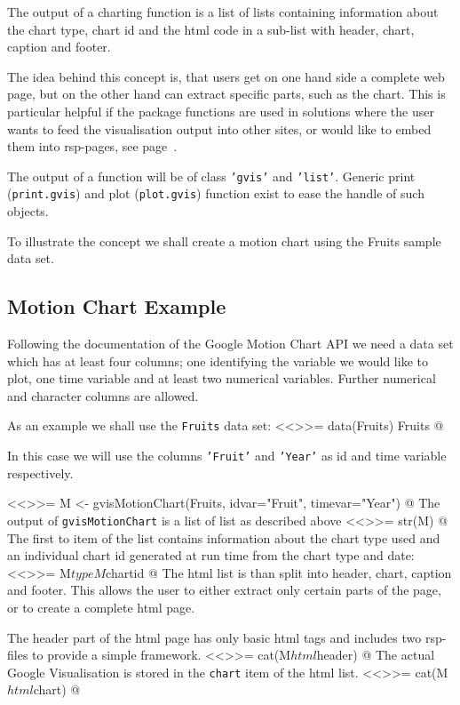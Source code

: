 The output of a \googleVis charting function is a list of lists
containing information about the chart type, chart id and the html
code in a  sub-list with header, chart, caption and footer.

The idea behind this concept is, that users get on one hand side a
complete web page, but on the other hand can extract specific parts,
such as the chart. This is particular helpful if the package functions
are used in solutions where the user wants to feed the visualisation
output into other sites, or would like to embed them into rsp-pages,
see page~\pageref{rspexample}.  

The output of a \googleVis function will be of class \texttt{'gvis'}
and \texttt{'list'}. Generic print (\texttt{print.gvis})  and plot
(\texttt{plot.gvis}) function exist to ease the handle of such objects. 

To illustrate the concept we shall create a motion chart using the Fruits
sample data set.

\subsection{Motion Chart Example}

Following the documentation of the Google Motion Chart API we need a
data set which has at least four columns; one identifying the
variable we would like to plot, one time variable and at least two
numerical variables. Further numerical and character columns are allowed.

As an example we shall use the \texttt{Fruits} data set:
<<>>=
data(Fruits)
Fruits
@

In this case we will use the columns \texttt{'Fruit'} and
\texttt{'Year'} as id and time variable respectively. 


<<>>=
 M <- gvisMotionChart(Fruits, idvar="Fruit", timevar="Year")
@
The output of \texttt{gvisMotionChart} is a list of list as described above
<<>>=
 str(M)
@ 
The first to item of the list contains information about the chart type
used and an individual chart id generated at run time from the chart
type and date:
<<>>=
M$type
M$chartid
@ 
The html list is than split into header, chart, caption and
footer. This allows the user to either extract only certain parts
of the page, or to create a complete html page. 

The header part of the html page has only basic html tags and includes
two rsp-files to provide a  simple framework.
<<>>=
cat(M$html$header)
@ 
The actual Google Visualisation is stored in the \texttt{chart} item
of the html list. 
<<>>=
cat(M$html$chart)
@

